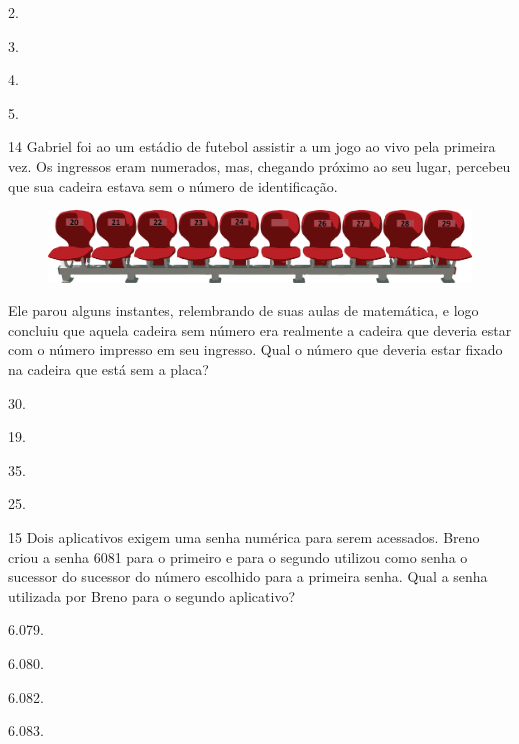 \begin{multicols}{2}
\begin{escolha}
\item
  2.
\item
  3.
\item
  4.
\item
  5.
\end{escolha}
\end{multicols}

\num{14} Gabriel foi ao um estádio de futebol assistir a um jogo ao vivo pela primeira vez. Os ingressos eram numerados, mas, chegando próximo ao seu
lugar, percebeu que sua cadeira estava sem o número de identificação.

\begin{figure}[htpb!]
\centering
\includegraphics[width=\textwidth]{./media/image107.png}
\end{figure}

Ele parou alguns instantes, relembrando de suas aulas de matemática, e logo concluiu que aquela cadeira sem número era realmente a cadeira que deveria estar com o número impresso em seu ingresso. Qual o número que
deveria estar fixado na cadeira que está sem a placa?

\begin{escolha}
\item
  30.
\item
  19.
\item
  35.
\item
  25.
\end{escolha}

\num{15} Dois aplicativos exigem uma senha numérica para serem acessados. Breno criou a senha 6081 para o primeiro e para o segundo utilizou como senha o sucessor do sucessor do número escolhido para a primeira senha. Qual a senha utilizada por Breno para o segundo aplicativo?

\begin{escolha}
\item
  6.079.
\item
  6.080.
\item
  6.082.
\item
  6.083.
\end{escolha}

\pagebreak

